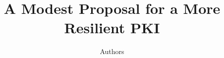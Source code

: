 \documentclass[conference]{IEEEtran}
\begin{document}
\title{
  A Modest Proposal for a More Resilient PKI
}
\author{
  Authors
}


\maketitle


\begin{abstract}
  
\end{abstract}























\end{document}

